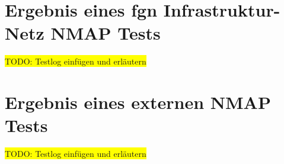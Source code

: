\documentclass[11pt,a4paper,titlepage=firstiscover,headsepline,bibtotoc]{scrartcl} %
\newcommand{\hilight}[1]{\colorbox{yellow}{#1}} %
\begin{document}
\newpage
\section{Ergebnis eines fgn Infrastruktur-Netz NMAP Tests}\label{sec:NMAP-Test-int}
\hilight{TODO: Testlog einfügen und erläutern}
\newpage
\section{Ergebnis eines externen NMAP Tests}\label{sec:NMAP-Test-ext}
\hilight{TODO: Testlog einfügen und erläutern}
\newpage

%
%
\end{document}
